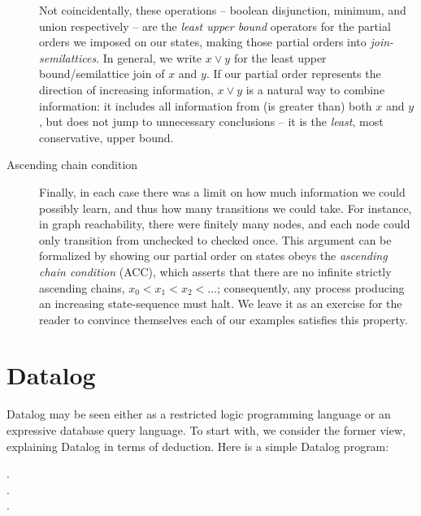 \begin{description}
  Not coincidentally, these operations -- boolean disjunction, minimum, and
  union respectively -- are the \emph{least upper bound} operators for the
  partial orders we imposed on our states, making those partial orders into
  \emph{join-semilattices}.
%
  In general, we write $x \vee y$ for the least upper bound/semilattice join of
  $x$ and $y$. If our partial order represents the direction of increasing
  information, $x \vee y$ is a natural way to combine information: it includes
  all information from (is greater than) both $x$ and $y$, but does not jump to
  unnecessary conclusions -- it is the \emph{least}, most conservative, upper
  bound.

\item[Ascending chain condition] Finally, in each case there was a limit on how
  much information we could possibly learn, and thus how many transitions we
  could take. For instance, in graph reachability, there were finitely many
  nodes, and each node could only transition from unchecked to checked once.
%
  This argument can be formalized by showing our partial order on states obeys
  the \emph{ascending chain condition} (ACC), which asserts that there are no
  infinite strictly ascending chains, $x_0 < x_1 < x_2 < \dots$; consequently,
  any process producing an increasing state-sequence must halt.
%
  We leave it as an exercise for the reader to convince themselves each of our
  examples satisfies this property. 
\end{description}

\noindent
{}



\section{Datalog}
\label{section-datalog}

Datalog may be seen either as a restricted logic programming language or an
expressive database query language. To start with, we consider the former view,
explaining Datalog in terms of deduction. Here is a simple Datalog program:

\begin{datalog}
  .
  \\
  .
  \\
   \gets {} \conj {}.
\end{datalog}

